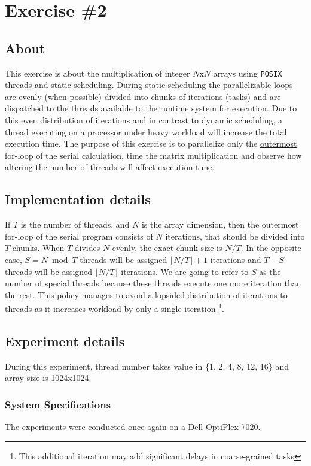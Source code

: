 \documentclass{article}
\begin{document}
\section{Exercise \#2}

\subsection{About}
This exercise is about the multiplication of integer $N$x$N$ arrays using \texttt{POSIX} threads
and static scheduling. During static scheduling the parallelizable loops are evenly (when
possible) divided into chunks of iterations (tasks) and are dispatched to the threads available
to the runtime system for execution. Due to this even distribution of iterations and in contrast
to dynamic scheduling, a thread executing on a processor under heavy workload will increase the
total execution time. The purpose of this exercise is to parallelize only the \underline{outermost}
for-loop of the serial calculation, time the matrix multiplication and observe how altering the
number of threads will affect execution time.

\subsection{Implementation details}
If $T$ is the number of threads, and $N$ is the array dimension, then the outermost
for-loop of the serial program consists of $N$ iterations, that should be divided
into $T$ chunks. When $T$ divides $N$ evenly, the exact chunk size is $N/T$. In the
opposite case, $S=N \bmod T$ threads will be assigned $\lfloor{N/T}\rfloor+1$ iterations
and $T-S$ threads will be assigned $\lfloor{N/T}\rfloor$ iterations. We are going
to refer to $S$ as the number of special threads because these threads execute one
more iteration than the rest. This policy manages to avoid a lopsided distribution
of iterations to threads as it increases workload by only a single iteration
\footnote{This additional iteration may add significant delays in coarse-grained
tasks}.

\newpage

\subsection{Experiment details}
During this experiment, thread number takes value in \{1, 2, 4, 8, 12, 16\} and array
size is 1024x1024.

\subsubsection{System Specifications}
The experiments were conducted once again on a Dell OptiPlex 7020.
\end{document}
